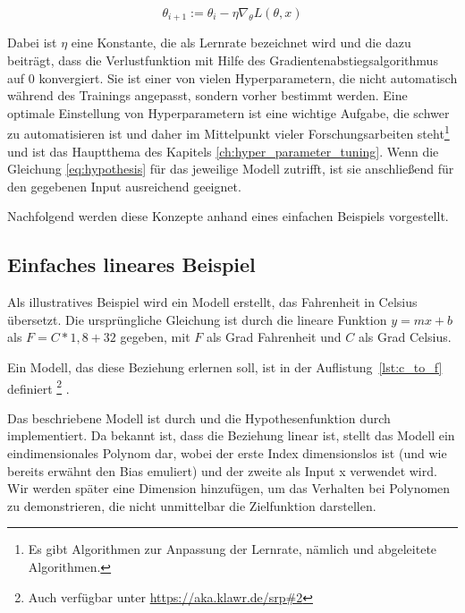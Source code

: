 \begin{equation}
    \theta_{i+1} := \theta_i - \eta \nabla_\theta L(\theta, x)
    \label{eq:gradient_descent}
\end{equation}

Dabei ist $\eta$ eine Konstante, die als Lernrate bezeichnet wird und die dazu beiträgt, dass die Verlustfunktion mit Hilfe des Gradientenabstiegsalgorithmus auf 0 konvergiert.
Sie ist einer von vielen Hyperparametern, die nicht automatisch während des Trainings angepasst, sondern vorher bestimmt werden.
Eine optimale Einstellung von Hyperparametern ist eine wichtige Aufgabe, die schwer zu automatisieren ist und daher im Mittelpunkt vieler Forschungsarbeiten steht\footnote{Es gibt Algorithmen zur Anpassung der Lernrate, nämlich  \cite{Duchi2010} und abgeleitete Algorithmen.} und ist das Hauptthema des Kapitels \ref{ch:hyper_parameter_tuning}.
Wenn die Gleichung \eqref{eq:hypothesis} für das jeweilige Modell zutrifft, ist sie anschließend für den gegebenen Input ausreichend geeignet.

Nachfolgend werden diese Konzepte anhand eines einfachen Beispiels vorgestellt.

\subsection{Einfaches lineares Beispiel} \label{ch:simple_linear_example}

Als illustratives Beispiel wird ein Modell erstellt, das Fahrenheit in Celsius übersetzt.
Die ursprüngliche Gleichung ist durch die lineare Funktion $y = mx + b$ als $F = C * 1,8 + 32$ gegeben, mit $F$ als Grad Fahrenheit und $C$ als Grad Celsius.

Ein Modell, das diese Beziehung erlernen soll, ist in der Auflistung~\ref{lst:c_to_f} definiert \footnote{Auch verfügbar unter \url{https://aka.klawr.de/srp\#2}} .



Das beschriebene Modell ist durch  und die Hypothesenfunktion durch  implementiert.
Da bekannt ist, dass die Beziehung linear ist, stellt das Modell ein eindimensionales Polynom dar, wobei der erste Index dimensionslos ist (und wie bereits erwähnt den Bias emuliert) und der zweite als Input x verwendet wird.
Wir werden später eine Dimension hinzufügen, um das Verhalten bei Polynomen zu demonstrieren, die nicht unmittelbar die Zielfunktion darstellen.

